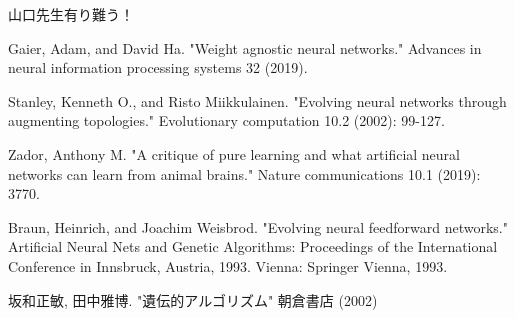 \documentclass[12pt, dvipdfmx]{jarticle}
\begin{document}

\tableofcontents %
\clearpage %



\clearpage

山口先生有り難う！ %

\begin{thebibliography}{99} %
     Gaier, Adam, and David Ha. "Weight agnostic neural networks." Advances in neural information processing systems 32 (2019).

     Stanley, Kenneth O., and Risto Miikkulainen. "Evolving neural networks through augmenting topologies." Evolutionary computation 10.2 (2002): 99-127.

     Zador, Anthony M. "A critique of pure learning and what artificial neural networks can learn from animal brains." Nature communications 10.1 (2019): 3770.

     Braun, Heinrich, and Joachim Weisbrod. "Evolving neural feedforward networks." Artificial Neural Nets and Genetic Algorithms: Proceedings of the International Conference in Innsbruck, Austria, 1993. Vienna: Springer Vienna, 1993.

     坂和正敏, 田中雅博. "遺伝的アルゴリズム" 朝倉書店 (2002)
\end{thebibliography}
\end{document}
